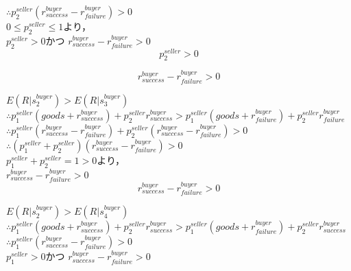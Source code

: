 \documentclass[twocolumn, a4j]{article}
\begin{document}
$\therefore p^{seller}_2 (r^{buyer}_{success} - r^{buyer}_{failure}) > 0$\\

$0 \leq p^{seller}_2 \leq 1$より，\\

$p^{seller}_2 > 0$かつ
$r^{buyer}_{success} - r^{buyer}_{failure} > 0$\\

\begin{equation}
  p^{seller}_2 > 0
\end{equation}

\begin{equation}
  \label{quad2-1}
  r^{buyer}_{success} - r^{buyer}_{failure} > 0
\end{equation}

$ E(R|s^{buyer}_2) > E(R|s^{buyer}_3)$\\

$\therefore p^{seller}_1 (goods + r^{buyer}_{success}) + p^{seller}_2 r^{buyer}_{success} > p^{seller}_1 (goods + r^{buyer}_{failure}) + p^{seller}_2 r^{buyer}_{failure}$\\

$\therefore p^{seller}_1 (r^{buyer}_{success} - r^{buyer}_{failure}) + p^{seller}_2 (r^{buyer}_{success} - r^{buyer}_{failure}) > 0$\\

$\therefore (p^{seller}_1 + p^{seller}_2)(r^{buyer}_{success} - r^{buyer}_{failure}) > 0$\\

$ p^{seller}_1 + p^{seller}_2 = 1 > 0$より，\\

$ r^{buyer}_{success} - r^{buyer}_{failure} > 0$\\

\begin{equation}
  \label{quad2-2}
  r^{buyer}_{success} - r^{buyer}_{failure} > 0
\end{equation}

$ E(R|s^{buyer}_2) > E(R|s^{buyer}_4)$\\

$\therefore p^{seller}_1 (goods + r^{buyer}_{success}) + p^{seller}_2 r^{buyer}_{success} > p^{seller}_1 (goods + r^{buyer}_{failure}) + p^{seller}_2 r^{buyer}_{success}$\\

$\therefore p^{seller}_1(r^{buyer}_{success} - r^{buyer}_{failure}) > 0$\\

$ p^{seller}_1 > 0$かつ
$ r^{buyer}_{success} - r^{buyer}_{failure} > 0$\\
\end{document}
